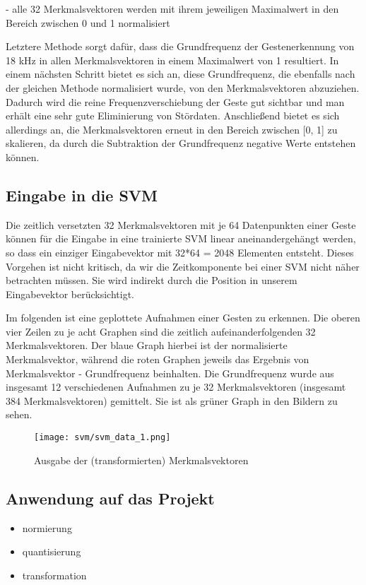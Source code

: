 - alle 32 Merkmalsvektoren werden mit ihrem jeweiligen Maximalwert in den Bereich zwischen 0 und 1 normalisiert

Letztere Methode sorgt dafür, dass die Grundfrequenz der Gestenerkennung von 18 kHz in allen Merkmalsvektoren in einem Maximalwert von 1 resultiert. 
In einem nächsten Schritt bietet es sich an, diese Grundfrequenz, die ebenfalls nach der gleichen Methode normalisiert wurde, von den Merkmalsvektoren abzuziehen. 
Dadurch wird die reine Frequenzverschiebung der Geste gut sichtbar und man erhält eine sehr gute Eliminierung von Stördaten. 
Anschließend bietet es sich allerdings an, die Merkmalsvektoren erneut in den Bereich zwischen [0, 1] zu skalieren, da durch die Subtraktion der Grundfrequenz negative Werte entstehen können.


\subsection{Eingabe in die SVM}

Die zeitlich versetzten 32 Merkmalsvektoren mit je 64 Datenpunkten einer Geste können für die Eingabe in eine trainierte SVM linear aneinandergehängt werden, so dass ein einziger Eingabevektor mit 32*64 = 2048 Elementen entsteht. 
Dieses Vorgehen ist nicht kritisch, da wir die Zeitkomponente bei einer SVM nicht näher betrachten müssen. 
Sie wird indirekt durch die Position in unserem Eingabevektor berücksichtigt.

Im folgenden ist eine geplottete Aufnahmen einer Gesten zu erkennen. 
Die oberen vier Zeilen zu je acht Graphen sind die zeitlich aufeinanderfolgenden 32 Merkmalsvektoren. 
Der blaue Graph hierbei ist der normalisierte Merkmalsvektor, während die roten Graphen jeweils das Ergebnis von Merkmalsvektor - Grundfrequenz beinhalten. 
Die Grundfrequenz wurde aus insgesamt 12 verschiedenen Aufnahmen zu je 32 Merkmalsvektoren (insgesamt 384 Merkmalsvektoren) gemittelt. 
Sie ist als grüner Graph in den Bildern zu sehen.

\begin{figure}[h!]
  \centering
    \texttt{[image: svm/svm\_data\_1.png]}
  \caption{Ausgabe der (transformierten) Merkmalsvektoren}
\end{figure}


\newpage 
\subsection{Anwendung auf das Projekt}
\begin{itemize}
\item{normierung}
\item{quantisierung}
\item{transformation}
\end{itemize}

